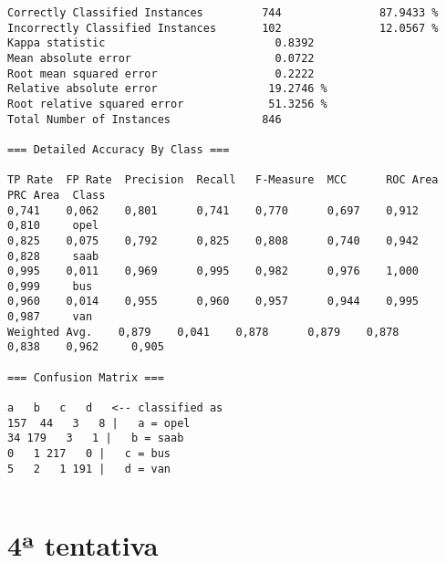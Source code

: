 \documentclass[
	article,			%
	11pt,				%
	oneside,			%
	a4paper,			%
	english,			%
	brazil,				%
	sumario=tradicional
	]{abntex2}
\begin{document}
\begin{lstlisting}
Correctly Classified Instances         744               87.9433 %
Incorrectly Classified Instances       102               12.0567 %
Kappa statistic                          0.8392
Mean absolute error                      0.0722
Root mean squared error                  0.2222
Relative absolute error                 19.2746 %
Root relative squared error             51.3256 %
Total Number of Instances              846     

=== Detailed Accuracy By Class ===

TP Rate  FP Rate  Precision  Recall   F-Measure  MCC      ROC Area  PRC Area  Class
0,741    0,062    0,801      0,741    0,770      0,697    0,912     0,810     opel
0,825    0,075    0,792      0,825    0,808      0,740    0,942     0,828     saab
0,995    0,011    0,969      0,995    0,982      0,976    1,000     0,999     bus
0,960    0,014    0,955      0,960    0,957      0,944    0,995     0,987     van
Weighted Avg.    0,879    0,041    0,878      0,879    0,878      0,838    0,962     0,905     

=== Confusion Matrix ===

a   b   c   d   <-- classified as
157  44   3   8 |   a = opel
34 179   3   1 |   b = saab
0   1 217   0 |   c = bus
5   2   1 191 |   d = van


\end{lstlisting}

\newpage

\section{4ª tentativa}
\end{document}
